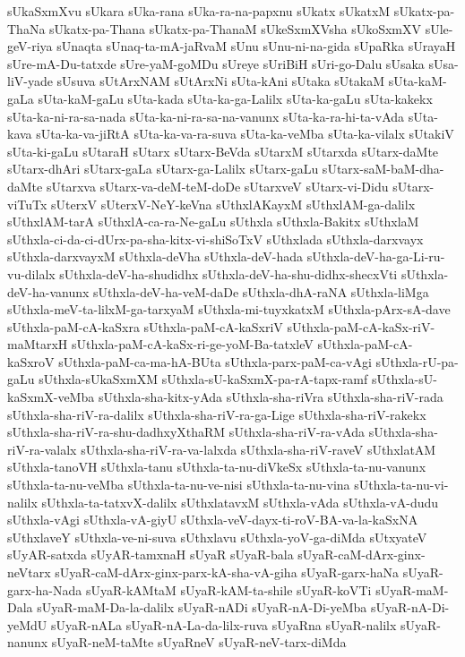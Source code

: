 {sUkaSxmXvu
sUkara
sUka-rana
sUka-ra-na-papxnu
sUkatx
sUkatxM
sUkatx-pa-ThaNa
sUkatx-pa-Thana
sUkatx-pa-ThanaM
sUkeSxmXVsha
sUkoSxmXV
sUle-geV-riya
sUnaqta
sUnaq-ta-mA-jaRvaM
sUnu
sUnu-ni-na-gida
sUpaRka
sUrayaH
sUre-mA-Du-tatxde
sUre-yaM-goMDu
sUreye
sUriBiH
sUri-go-Dalu
sUsaka
sUsa-liV-yade
sUsuva
sUtArxNAM
sUtArxNi
sUta-kAni
sUtaka
sUtakaM
sUta-kaM-gaLa
sUta-kaM-gaLu
sUta-kada
sUta-ka-ga-Lalilx
sUta-ka-gaLu
sUta-kakekx
sUta-ka-ni-ra-sa-nada
sUta-ka-ni-ra-sa-na-vanunx
sUta-ka-ra-hi-ta-vAda
sUta-kava
sUta-ka-va-jiRtA
sUta-ka-va-ra-suva
sUta-ka-veMba
sUta-ka-vilalx
sUtakiV
sUta-ki-gaLu
sUtaraH
sUtarx
sUtarx-BeVda
sUtarxM
sUtarxda
sUtarx-daMte
sUtarx-dhAri
sUtarx-gaLa
sUtarx-ga-Lalilx
sUtarx-gaLu
sUtarx-saM-baM-dha-daMte
sUtarxva
sUtarx-va-deM-teM-doDe
sUtarxveV
sUtarx-vi-Didu
sUtarx-viTuTx
sUterxV
sUterxV-NeY-keVna
sUthxlAKayxM
sUthxlAM-ga-dalilx
sUthxlAM-tarA
sUthxlA-ca-ra-Ne-gaLu
sUthxla
sUthxla-Bakitx
sUthxlaM
sUthxla-ci-da-ci-dUrx-pa-sha-kitx-vi-shiSoTxV
sUthxlada
sUthxla-darxvayx
sUthxla-darxvayxM
sUthxla-deVha
sUthxla-deV-hada
sUthxla-deV-ha-ga-Li-ru-vu-dilalx
sUthxla-deV-ha-shudidhx
sUthxla-deV-ha-shu-didhx-shecxVti
sUthxla-deV-ha-vanunx
sUthxla-deV-ha-veM-daDe
sUthxla-dhA-raNA
sUthxla-liMga
sUthxla-meV-ta-lilxM-ga-tarxyaM
sUthxla-mi-tuyxkatxM
sUthxla-pArx-sA-dave
sUthxla-paM-cA-kaSxra
sUthxla-paM-cA-kaSxriV
sUthxla-paM-cA-kaSx-riV-maMtarxH
sUthxla-paM-cA-kaSx-ri-ge-yoM-Ba-tatxleV
sUthxla-paM-cA-kaSxroV
sUthxla-paM-ca-ma-hA-BUta
sUthxla-parx-paM-ca-vAgi
sUthxla-rU-pa-gaLu
sUthxla-sUkaSxmXM
sUthxla-sU-kaSxmX-pa-rA-tapx-ramf
sUthxla-sU-kaSxmX-veMba
sUthxla-sha-kitx-yAda
sUthxla-sha-riVra
sUthxla-sha-riV-rada
sUthxla-sha-riV-ra-dalilx
sUthxla-sha-riV-ra-ga-Lige
sUthxla-sha-riV-rakekx
sUthxla-sha-riV-ra-shu-dadhxyXthaRM
sUthxla-sha-riV-ra-vAda
sUthxla-sha-riV-ra-valalx
sUthxla-sha-riV-ra-va-lalxda
sUthxla-sha-riV-raveV
sUthxlatAM
sUthxla-tanoVH
sUthxla-tanu
sUthxla-ta-nu-diVkeSx
sUthxla-ta-nu-vanunx
sUthxla-ta-nu-veMba
sUthxla-ta-nu-ve-nisi
sUthxla-ta-nu-vina
sUthxla-ta-nu-vi-nalilx
sUthxla-ta-tatxvX-dalilx
sUthxlatavxM
sUthxla-vAda
sUthxla-vA-dudu
sUthxla-vAgi
sUthxla-vA-giyU
sUthxla-veV-dayx-ti-roV-BA-va-la-kaSxNA
sUthxlaveY
sUthxla-ve-ni-suva
sUthxlavu
sUthxla-yoV-ga-diMda
sUtxyateV
sUyAR-satxda
sUyAR-tamxnaH
sUyaR
sUyaR-bala
sUyaR-caM-dArx-ginx-neVtarx
sUyaR-caM-dArx-ginx-parx-kA-sha-vA-giha
sUyaR-garx-haNa
sUyaR-garx-ha-Nada
sUyaR-kAMtaM
sUyaR-kAM-ta-shile
sUyaR-koVTi
sUyaR-maM-Dala
sUyaR-maM-Da-la-dalilx
sUyaR-nADi
sUyaR-nA-Di-yeMba
sUyaR-nA-Di-yeMdU
sUyaR-nALa
sUyaR-nA-La-da-lilx-ruva
sUyaRna
sUyaR-nalilx
sUyaR-nanunx
sUyaR-neM-taMte
sUyaRneV
sUyaR-neV-tarx-diMda
}
